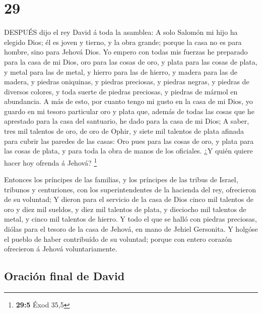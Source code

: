 \hypertarget{section-28}{%
\section{29}\label{section-28}}

 DESPUÉS dijo el rey David á toda la asamblea: A solo
Salomón mi hijo ha elegido Dios; él es joven y tierno, y la obra grande;
porque la casa no es para hombre, sino para Jehová Dios.  Yo
empero con todas mis fuerzas he preparado para la casa de mi Dios, oro
para las cosas de oro, y plata para las cosas de plata, y metal para las
de metal, y hierro para las de hierro, y madera para las de madera, y
piedras oniquinas, y piedras preciosas, y piedras negras, y piedras de
diversos colores, y toda suerte de piedras preciosas, y piedras de
mármol en abundancia.  A más de esto, por cuanto tengo mi
gusto en la casa de mi Dios, yo guardo en mi tesoro particular oro y
plata que, además de todas las cosas que he aprestado para la casa del
santuario, he dado para la casa de mi Dios;  A saber, tres
mil talentos de oro, de oro de Ophir, y siete mil talentos de plata
afinada para cubrir las paredes de las casas:  Oro pues para
las cosas de oro, y plata para las cosas de plata, y para toda la obra
de manos de los oficiales. ¿Y quién quiere hacer hoy ofrenda á Jehová?
\footnote{\textbf{29:5} Éxod 35,5}

 Entonces los príncipes de las familias, y los príncipes de
las tribus de Israel, tribunos y centuriones, con los superintendentes
de la hacienda del rey, ofrecieron de su voluntad;  Y dieron
para el servicio de la casa de Dios cinco mil talentos de oro y diez mil
sueldos, y diez mil talentos de plata, y dieciocho mil talentos de
metal, y cinco mil talentos de hierro.  Y todo el que se
halló con piedras preciosas, diólas para el tesoro de la casa de Jehová,
en mano de Jehiel Gersonita.  Y holgóse el pueblo de haber
contribuído de su voluntad; porque con entero corazón ofrecieron á
Jehová voluntariamente.

\hypertarget{oraciuxf3n-final-de-david}{%
\subsection{Oración final de David}\label{oraciuxf3n-final-de-david}}

